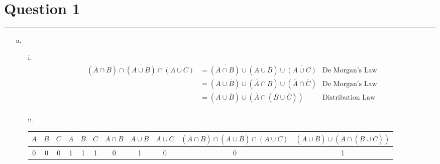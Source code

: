 \documentclass{article}
\begin{document}
\newcommand{\documentcourse}{COMP2121}
\newcommand{\documentnumber}{2}





\section*{Question 1}
\hrule
\vspace{0.5cm}
\begin{enumerate}
    \item[a.] \begin{enumerate}
            \item[i.] \[\begin{aligned}
                        \overline{(\overline{A}\cap B)\cap(A\cup\overline{B})\cap(A\cup C)} & = \overline{(\overline{A}\cap B)}\cup\overline{(A\cup\overline{B})}\cup\overline{(A\cup C)} & \text{De Morgan's Law}  \\
                                                                                            & = (A\cup\overline{B})\cup(\overline{A}\cap B)\cup(\overline{A}\cap\overline{C})             & \text{De Morgan's Law}  \\
                                                                                            & = (A\cup\overline{B})\cup(\overline{A}\cap(B\cup\overline{C}))                              & \text{Distribution Law} \\
                    \end{aligned}\]
            \item [ii.]
                  \begin{center}
                      \centering
                      \begin{tabular}{|c|c|c|c|c|c|c|c|c|c|c|}
                          \hline
                          $A$ & $B$ & $C$ & $\overline{A}$ & $\overline{B}$ & $\overline{C}$ & $\overline{A} \cap B$ & $A \cup \overline{B}$ & $A \cup C$ & $(\overline{A} \cap B) \cap (A \cup \overline{B}) \cap (A \cup C)$ & $(A \cup \overline{B}) \cup (\overline{A} \cap (B \cup \overline{C}))$ \\ \hline
                          0   & 0   & 0   & 1              & 1              & 1              & 0                     & 1                     & 0          & 0                                                                  & 1                                                                      \\ \hline

\end{tabular}
\end{center}
\end{enumerate}
\end{enumerate}
\end{document}
